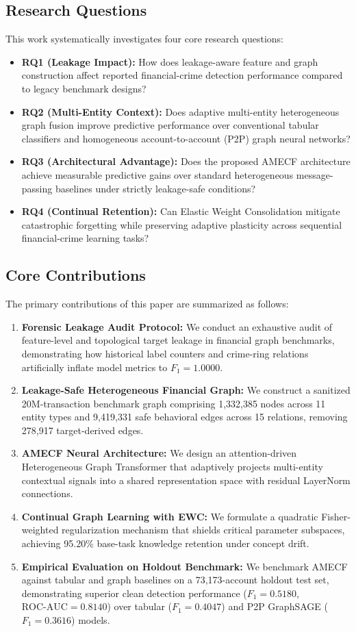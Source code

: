 \documentclass[conference]{IEEEtran}
\begin{document}
\subsection{Research Questions}
This work systematically investigates four core research questions:
\begin{itemize}
    \item \textbf{RQ1 (Leakage Impact):} How does leakage-aware feature and graph construction affect reported financial-crime detection performance compared to legacy benchmark designs?
    \item \textbf{RQ2 (Multi-Entity Context):} Does adaptive multi-entity heterogeneous graph fusion improve predictive performance over conventional tabular classifiers and homogeneous account-to-account (P2P) graph neural networks?
    \item \textbf{RQ3 (Architectural Advantage):} Does the proposed AMECF architecture achieve measurable predictive gains over standard heterogeneous message-passing baselines under strictly leakage-safe conditions?
    \item \textbf{RQ4 (Continual Retention):} Can Elastic Weight Consolidation mitigate catastrophic forgetting while preserving adaptive plasticity across sequential financial-crime learning tasks?
\end{itemize}

\subsection{Core Contributions}
The primary contributions of this paper are summarized as follows:
\begin{enumerate}
    \item \textbf{Forensic Leakage Audit Protocol:} We conduct an exhaustive audit of feature-level and topological target leakage in financial graph benchmarks, demonstrating how historical label counters and crime-ring relations artificially inflate model metrics to $F_1 = 1.0000$.
    \item \textbf{Leakage-Safe Heterogeneous Financial Graph:} We construct a sanitized 20M-transaction benchmark graph comprising 1,332,385 nodes across 11 entity types and 9,419,331 safe behavioral edges across 15 relations, removing 278,917 target-derived edges.
    \item \textbf{AMECF Neural Architecture:} We design an attention-driven Heterogeneous Graph Transformer that adaptively projects multi-entity contextual signals into a shared representation space with residual LayerNorm connections.
    \item \textbf{Continual Graph Learning with EWC:} We formulate a quadratic Fisher-weighted regularization mechanism that shields critical parameter subspaces, achieving 95.20\% base-task knowledge retention under concept drift.
    \item \textbf{Empirical Evaluation on Holdout Benchmark:} We benchmark AMECF against tabular and graph baselines on a 73,173-account holdout test set, demonstrating superior clean detection performance ($F_1 = 0.5180$, $\text{ROC-AUC} = 0.8140$) over tabular ($F_1 = 0.4047$) and P2P GraphSAGE ($F_1 = 0.3616$) models.
\end{enumerate}
\end{document}
